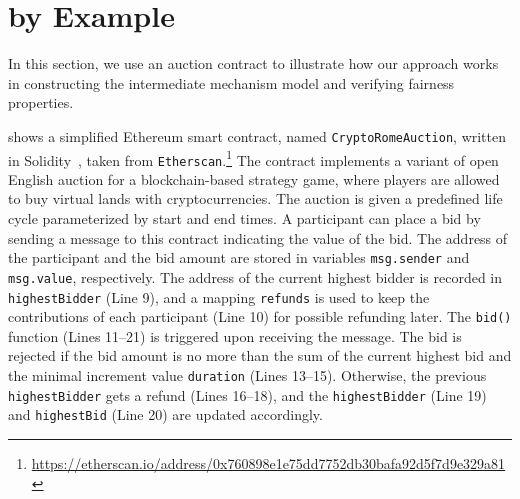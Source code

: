 \section{\tool by Example}\label{Sec_MotivatingExample}


In this section, we use an auction contract to illustrate how our approach works in
constructing the intermediate mechanism model and verifying fairness properties.

\begin{example}\label{exp:cryptorome}
 shows a simplified Ethereum smart contract,
named \texttt{CryptoRomeAuction}, written in Solidity~\cite{solidity}, taken from
\texttt{Etherscan}.\footnote{\url{https://etherscan.io/address/0x760898e1e75dd7752db30bafa92d5f7d9e329a81}}
The contract implements a variant of open English auction for a blockchain-based strategy game,
where players are allowed to buy virtual lands with cryptocurrencies.
The auction is given a predefined life cycle parameterized by start and end times.
A participant can place a bid by sending a message to this contract indicating the value of the bid.
The address of the participant and the bid amount are stored in variables \texttt{msg.sender} and
\texttt{msg.value}, respectively.
The address of the current highest bidder is recorded in \texttt{highestBidder} (Line 9), and a
mapping \texttt{refunds} is used to keep the contributions of each participant (Line 10) for
possible refunding later.
The \texttt{bid()} function (Lines 11--21) is triggered upon receiving the message.
The bid is rejected if the bid amount is no more than the sum of the current highest bid
and the minimal increment value \texttt{duration} (Lines 13--15).
Otherwise, the previous \texttt{highestBidder} gets a refund (Lines 16--18), and the
\texttt{highestBidder} (Line 19) and \texttt{highestBid} (Line 20) are updated accordingly.
\end{example}

